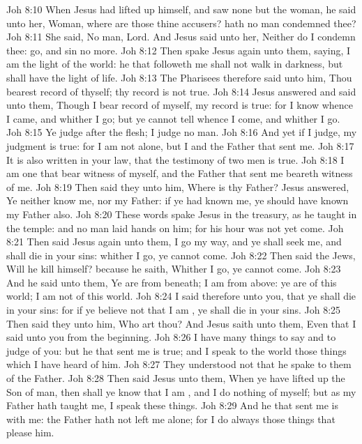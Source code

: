\vs Joh 8:10 When Jesus had lifted up himself, and saw none but the woman, he said unto her, Woman, where are those thine accusers? hath no man condemned thee?
\vs Joh 8:11 She said, No man, Lord. And Jesus said unto her, Neither do I condemn thee: go, and sin no more.
\vs Joh 8:12 Then spake Jesus again unto them, saying, I am the light of the world: he that followeth me shall not walk in darkness, but shall have the light of life.
\vs Joh 8:13 The Pharisees therefore said unto him, Thou bearest record of thyself; thy record is not true.
\vs Joh 8:14 Jesus answered and said unto them, Though I bear record of myself,  my record is true: for I know whence I came, and whither I go; but ye cannot tell whence I come, and whither I go.
\vs Joh 8:15 Ye judge after the flesh; I judge no man.
\vs Joh 8:16 And yet if I judge, my judgment is true: for I am not alone, but I and the Father that sent me.
\vs Joh 8:17 It is also written in your law, that the testimony of two men is true.
\vs Joh 8:18 I am one that bear witness of myself, and the Father that sent me beareth witness of me.
\vs Joh 8:19 Then said they unto him, Where is thy Father? Jesus answered, Ye neither know me, nor my Father: if ye had known me, ye should have known my Father also.
\vs Joh 8:20 These words spake Jesus in the treasury, as he taught in the temple: and no man laid hands on him; for his hour was not yet come.
\vs Joh 8:21 Then said Jesus again unto them, I go my way, and ye shall seek me, and shall die in your sins: whither I go, ye cannot come.
\vs Joh 8:22 Then said the Jews, Will he kill himself? because he saith, Whither I go, ye cannot come.
\vs Joh 8:23 And he said unto them, Ye are from beneath; I am from above: ye are of this world; I am not of this world.
\vs Joh 8:24 I said therefore unto you, that ye shall die in your sins: for if ye believe not that I am , ye shall die in your sins.
\vs Joh 8:25 Then said they unto him, Who art thou? And Jesus saith unto them, Even  that I said unto you from the beginning.
\vs Joh 8:26 I have many things to say and to judge of you: but he that sent me is true; and I speak to the world those things which I have heard of him.
\vs Joh 8:27 They understood not that he spake to them of the Father.
\vs Joh 8:28 Then said Jesus unto them, When ye have lifted up the Son of man, then shall ye know that I am , and  I do nothing of myself; but as my Father hath taught me, I speak these things.
\vs Joh 8:29 And he that sent me is with me: the Father hath not left me alone; for I do always those things that please him.
